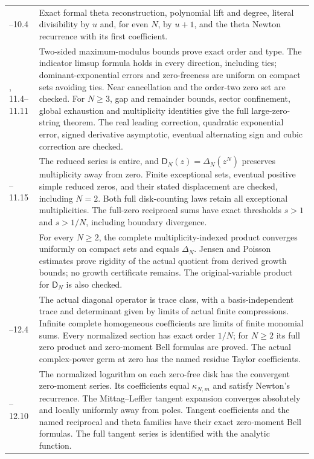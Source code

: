 \documentclass[11pt]{article}
\theoremstyle{definition}
\theoremstyle{remark}
\newcommand{\Dfun}{\mathsf D}
\begin{document}
\begin{longtable}{@{}>{\raggedright\arraybackslash}p{}>{\raggedright\arraybackslash}p{}@{}}
10.1--10.4 & Exact formal theta reconstruction, polynomial lift and degree,
literal divisibility by $u$ and, for even $N$, by $u+1$, and the theta Newton
recurrence with its first coefficient. \\
11.2, 11.4--11.11 & Two-sided maximum-modulus bounds prove exact order
and type. The indicator limsup formula holds in every direction, including ties;
dominant-exponential errors and zero-freeness are uniform on compact sets
avoiding ties. Near cancellation and the order-two zero set are checked.
For $N\geq3$, gap and remainder bounds, sector confinement, global exhaustion
and multiplicity identities give the full large-zero-string theorem.
The real leading correction, quadratic exponential error, signed derivative
asymptotic, eventual alternating sign and cubic correction are checked. \\
11.13--11.15 & The reduced series is entire, and
$\Dfun_N(z)=\Delta_N(z^N)$ preserves multiplicity away from zero. Finite
exceptional sets, eventual positive simple reduced zeros, and their stated
displacement are checked, including $N=2$. Both full disk-counting laws
retain all exceptional multiplicities. The full-zero reciprocal sums have
exact thresholds $s>1$ and $s>1/N$, including boundary divergence. \\
12.1 & For every $N\geq2$, the complete multiplicity-indexed product
converges uniformly on compact sets and equals $\Delta_N$. Jensen and Poisson
estimates prove rigidity of the actual quotient from derived growth bounds;
no growth certificate remains. The original-variable product for $\Dfun_N$
is also checked. \\
12.2--12.4 & The actual diagonal operator is trace class, with a
basis-independent trace and determinant given by limits of actual finite
compressions. Infinite complete homogeneous coefficients are limits of finite
monomial sums. Every normalized section has exact order $1/N$; for $N\geq2$
its full zero product and zero-moment Bell formulas are proved. The actual
complex-power germ at zero has the named residue Taylor coefficients. \\
12.6--12.10 & The normalized logarithm on each zero-free disk has the
convergent zero-moment series. Its coefficients equal $\kappa_{N,m}$ and
satisfy Newton's recurrence. The Mittag--Leffler tangent expansion converges
absolutely and locally uniformly away from poles. Tangent coefficients and
the named reciprocal and theta families have their exact zero-moment Bell
formulas. The full tangent series is identified with the analytic function. \\

\end{longtable}
\end{document}
